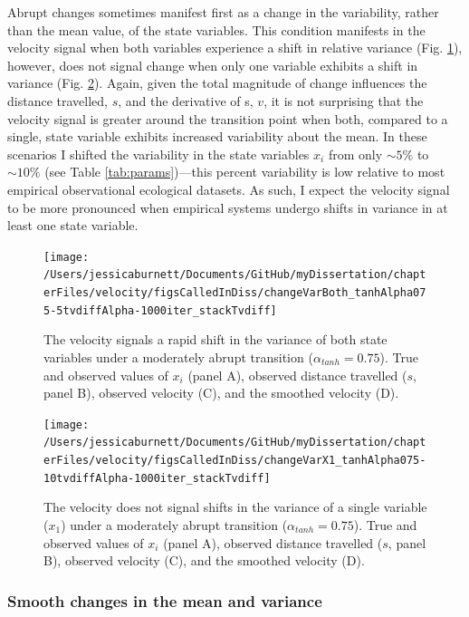 \documentclass[12pt,twoside,openany]{reedthesis}
\begin{document}
Abrupt changes sometimes manifest first as a change in the variability, rather than the mean value, of the state variables. This condition manifests in the velocity signal when both variables experience a shift in relative variance (Fig. \ref{fig:varBoth}), however, does not signal change when only one variable exhibits a shift in variance (Fig. \ref{fig:var1}). Again, given the total magnitude of change influences the distance travelled, \(s\), and the derivative of s, \(v\), it is not surprising that the velocity signal is greater around the transition point when both, compared to a single, state variable exhibits increased variability about the mean. In these scenarios I shifted the variability in the state variables \(x_i\) from only \(\sim 5\%\) to \(\sim10\%\) (see Table \ref{tab:params})---this percent variability is low relative to most empirical observational ecological datasets. As such, I expect the velocity signal to be more pronounced when empirical systems undergo shifts in variance in at least one state variable.
\begin{figure}
\texttt{[image: /Users/jessicaburnett/Documents/GitHub/myDissertation/chapterFiles/velocity/figsCalledInDiss/changeVarBoth\_tanhAlpha075-5tvdiffAlpha-1000iter\_stackTvdiff]} \caption{The velocity signals a rapid shift in the variance of both state variables under a moderately abrupt transition ($\alpha_{tanh}=0.75$). True and observed values of $x_i$ (panel A), observed distance travelled ($s$, panel B), observed velocity (C), and the smoothed velocity (D). }\label{fig:varBoth}
\end{figure}
\begin{figure}
\texttt{[image: /Users/jessicaburnett/Documents/GitHub/myDissertation/chapterFiles/velocity/figsCalledInDiss/changeVarX1\_tanhAlpha075-10tvdiffAlpha-1000iter\_stackTvdiff]} \caption{The velocity does not signal shifts in the variance of a single variable ($x_1$) under a moderately abrupt transition ($\alpha_{tanh}=0.75$). True and observed values of $x_i$ (panel A), observed distance travelled ($s$, panel B), observed velocity (C), and the smoothed velocity (D). }\label{fig:var1}
\end{figure}
\hypertarget{smooth-changes-in-the-mean-and-variance}{%
\subsubsection{Smooth changes in the mean and variance}\label{smooth-changes-in-the-mean-and-variance}}
\end{document}
